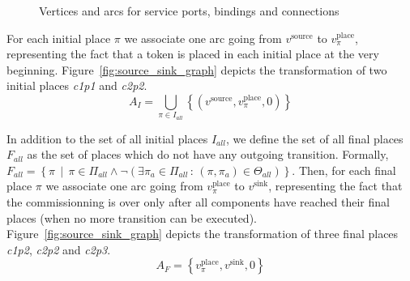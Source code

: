 \begin{figure}[h]
{\begin{minipage}[c]{1.3\columnwidth}
    \end{minipage}
  }
  \caption{Vertices and arcs for service ports, bindings and connections}
  \label{fig:service_ports_graph}
\end{figure}

For each initial place $\pi$ we associate one arc going from $v^\text{source}$
 to $v_\pi^\text{place}$, representing the fact that a token is placed in each
 initial place at the very beginning.
Figure~\ref{fig:source_sink_graph} depicts the transformation of two initial
places \emph{c1p1} and \emph{c2p2}.
\[
A_{I}=\bigcup_{\pi\in I_{all}}\left\{ \left(v^\text{source},v_\pi^\text{place},0\right)\right\} 
\]

In addition to the set of all initial places $I_{all}$, we define
the set of all final places $F_{all}$ as the set of places which
do not have any outgoing transition. Formally,
$F_{all}=\left\{ \pi\,\mid\,\pi\in\Pi_{all}\land\lnot\left(\exists\pi_{a}\in\Pi_{all}\,:\,\left(\pi,\pi_{a}\right)\in\Theta_{all}\right)\right\} $.
Then, for each final place $\pi$ we associate one arc going from
$v_\pi^\text{place}$ to $v^\text{sink}$, representing the fact that the
commissionning is over only after all components have reached their final places
(\ie when no more transition can be executed).
Figure~\ref{fig:source_sink_graph} depicts the transformation of three final
places \emph{c1p2}, \emph{c2p2} and \emph{c2p3}.
\[
A_{F}=\left\{ v_\pi^\text{place},v^\text{sink},0\right\} 
\]

